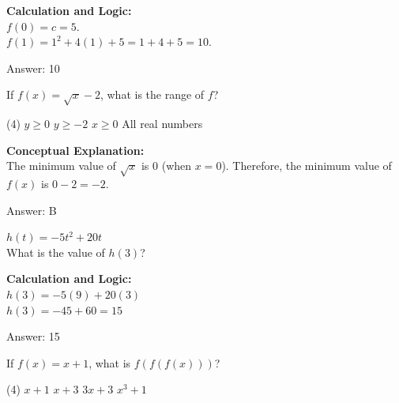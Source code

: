 \documentclass[11pt,paper=a4,answers]{exam}
\begin{document}
\begin{questions}
\begin{solution}
\textbf{Calculation and Logic:} \\
$f(0) = c = 5$. \\
$f(1) = 1^2 + 4(1) + 5 = 1 + 4 + 5 = 10$.

\vspace{30pt}

Answer: \colorbox{yellow!100}{10}
\end{solution}

\vspace{40pt}

\question
If $f(x) = \sqrt{x} - 2$, what is the range of $f$?
\begin{tasks}(4)
    \task $y \geq 0$
    \task $y \geq -2$
    \task $x \geq 0$
    \task All real numbers
\end{tasks}

\begin{solution}
\textbf{Conceptual Explanation:} \\
The minimum value of $\sqrt{x}$ is 0 (when $x=0$). Therefore, the minimum value of $f(x)$ is $0 - 2 = -2$.

\vspace{30pt}

Answer: \colorbox{yellow!100}{B}
\end{solution}

\vspace{40pt}

\question
$h(t) = -5t^2 + 20t$ \\
What is the value of $h(3)$?

\begin{solution}
\textbf{Calculation and Logic:} \\
$h(3) = -5(9) + 20(3)$ \\
$h(3) = -45 + 60 = 15$

\vspace{30pt}

Answer: \colorbox{yellow!100}{15}
\end{solution}

\vspace{40pt}

\question
If $f(x) = x+1$, what is $f(f(f(x)))$?
\begin{tasks}(4)
    \task $x+1$
    \task $x+3$
    \task $3x+3$
    \task $x^3+1$
\end{tasks}


\end{questions}
\end{document}
